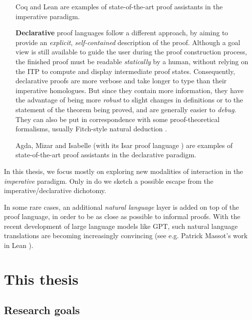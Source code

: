 \begin{itemize}
  Coq and Lean are examples of state-of-the-art proof assistants in the
  imperative paradigm.
  
  \item[\textbf{Declarative}] proof languages follow a different approach, by
  aiming to provide an \emph{explicit}, \emph{self-contained} description of the
  proof. Although a goal view is still available to guide the user during the
  proof construction process, the finished proof must be readable
  \emph{statically} by a human, without relying on the ITP to compute and
  display intermediate proof states. Consequently, declarative proofs are more
  verbose and take longer to type than their imperative homologues. But since
  they contain more information, they have the advantage of being more
  \emph{robust} to slight changes in definitions or to the statement of the
  theorem being proved, and are generally easier to \emph{debug}. They can also
  be put in correspondence with some proof-theoretical formalisms, usually
  Fitch-style natural deduction \cite{geuvers_proof_2009}.
  
  Agda, Mizar and Isabelle (with its Isar proof language ) are
  examples of state-of-the-art proof assistants in the declarative paradigm.
\end{itemize}

\begin{emphpar}
  In this thesis, we focus mostly on exploring new modalities of interaction in
  the \emph{imperative} paradigm. Only in  do we
  sketch a possible escape from the imperative/declarative dichotomy.
\end{emphpar}

\begin{remark}
In some rare cases, an additional \emph{natural language} layer is added on
top of the proof language, in order to be as close as possible to informal
proofs. With the recent development of large language models like GPT, such
natural language translations are becoming increasingly convincing (see e.g.
Patrick Massot's work in Lean \cite{LeanIPAM}).
\end{remark}


\section{This thesis}

\subsection{Research goals}

